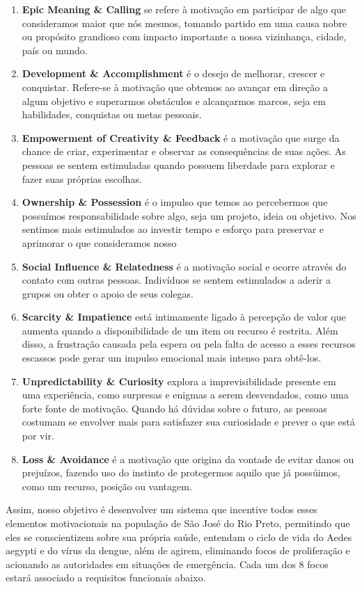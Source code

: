 \documentclass[a5paper, 12pt]{article}
\begin{document}
\begin{enumerate}
    \item \textbf{Epic Meaning \& Calling} se refere à motivação em participar de algo que consideramos maior que nós mesmos, tomando partido em uma causa nobre ou propósito grandioso com impacto importante a nossa vizinhança, cidade, país ou mundo. 
    \item \textbf{Development \& Accomplishment} é o desejo de melhorar, crescer e conquistar. Refere-se à motivação que obtemos ao avançar em direção a algum objetivo e superarmos obstáculos e alcançarmos marcos, seja em habilidades, conquistas ou metas pessoais.
    \item \textbf{Empowerment of Creativity \& Feedback} é a motivação que surge da chance de criar, experimentar e observar as consequências de suas ações. As pessoas se sentem estimuladas quando possuem liberdade para explorar e fazer suas próprias escolhas. 
    \item \textbf{Ownership \& Possession} é o impulso que temos ao percebermos que possuímos responsabilidade sobre algo, seja um projeto, ideia ou objetivo. Nos sentimos mais estimulados ao investir tempo e esforço para preservar e aprimorar o que consideramos nosso
    \item \textbf{Social Influence \& Relatedness} é a motivação social e ocorre através do contato com outras pessoas. Indivíduos se sentem estimulados a aderir a grupos ou  obter o apoio de seus colegas. 
    \item \textbf{Scarcity \& Impatience} está intimamente ligado à percepção de valor que aumenta quando a disponibilidade de um item ou recurso é restrita. Além disso, a frustração causada pela espera ou pela falta de acesso a esses recursos escassos pode gerar um impulso emocional mais intenso para obtê-los.
    \item \textbf{Unpredictability \& Curiosity} explora a imprevisibilidade presente em uma experiência, como surpresas e enigmas a serem desvendados, como uma forte fonte de motivação. Quando há dúvidas sobre o futuro, as pessoas costumam se envolver mais para satisfazer sua curiosidade e prever o que está por vir.
    \item \textbf{Loss \& Avoidance} é a motivação que origina da vontade de evitar danos ou prejuízos, fazendo uso do instinto de protegermos aquilo que já possúimos, como um recurso, posição ou vantagem.
\end{enumerate}

Assim, nosso objetivo é desenvolver um sistema que incentive todos esses elementos motivacionais na população de São José do Rio Preto, permitindo que eles se conscientizem sobre sua própria saúde, entendam o ciclo de vida do Aedes aegypti e do vírus da dengue, além de agirem, eliminando focos de proliferação e acionando as autoridades em situações de emergência. Cada um dos 8 focos estará associado a requisitos funcionais abaixo.
\end{document}
